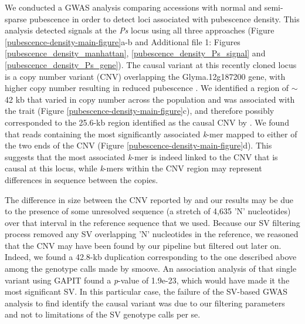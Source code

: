 We conducted a GWAS analysis comparing accessions with normal and semi-sparse
pubes\-cence in order to detect loci associated with pubescence density. This analysis
detected signals at the \textit{Ps} locus using all three approaches (Figure
\ref{pubescence-density-main-figure}a-b and Additional file 1: Figures \ref{pubescence_density_manhattan}, \ref{pubescence_density_Ps_signal}
and \ref{pubescence_density_Ps_gene}). The causal
variant at this recently cloned locus is a copy number variant (CNV) overlapping the
Glyma.12g187200 gene, with higher copy number resulting in reduced pubescence \citep{liu2020ps}.
We identified a region of $\sim$42 kb that varied in copy number across
the population and was associated with the trait (Figure
\ref{pubescence-density-main-figure}c), and therefore possibly corresponded to the
25.6-kb region identified as the causal CNV by \cite{liu2020ps}. We found that
reads containing the most significantly associated \textit{k}-mer mapped to either of the two ends
of the CNV (Figure \ref{pubescence-density-main-figure}d). This suggests that
the most associated \textit{k}-mer is indeed linked to the CNV
that is causal at this locus, while \textit{k}-mers within the
CNV region may represent differences in sequence between the copies.

The difference in size between the CNV reported by \cite{liu2020ps} and our
results may be due to the presence of some unresolved sequence (a stretch of
4,635 'N' nucleotides) over that interval in the reference sequence that we used.
Because our SV filtering process removed any SV overlapping 'N' nucleotides in
the reference, we reasoned that the CNV may have been found by our pipeline but
filtered out later on. Indeed, we found a 42.8-kb duplication corresponding
to the one described above among the genotype calls made by smoove. An association
analysis of that single variant using GAPIT found a \textit{p}-value of 1.9e-23,
which would have made it the most significant SV. In this particular case, the
failure of the SV-based GWAS analysis to find identify the causal variant was due
to our filtering parameters and not to limitations of the SV genotype calls per se.

